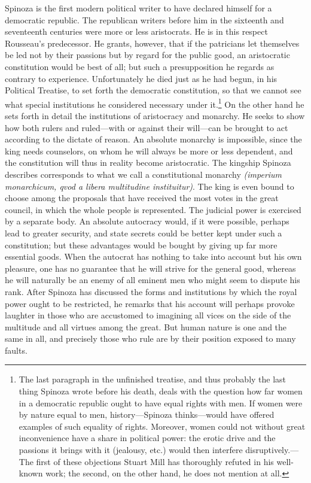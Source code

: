 \documentclass[12pt]{book}
\newcommand{\opage}[1]{\marginnote{\footnotesize\textit{[#1]}}}
\begin{document}
Spinoza is the first modern political writer to have declared himself for a democratic
republic. The republican writers before him in the sixteenth and seventeenth centuries
were more or less aristocrats. He is in this respect Rousseau's predecessor. He grants,
however, that if the patricians let themselves be led not by their passions but by
regard for the public good, an aristocratic constitution would be best of all; but such a
presupposition he regards as contrary to experience. Unfortunately he died just as he had
begun, in his Political Treatise, to set forth the democratic constitution, so that we
cannot see what special institutions he considered \opage{153}necessary under
it.\footnote{The last paragraph in the unfinished treatise, and thus probably the last
thing Spinoza wrote before his death, deals with the question how far women in a
democratic republic ought to have equal rights with men. If women were by nature equal to
men, history---Spinoza thinks---would have offered examples of such equality of rights.
Moreover, women could not without great inconvenience have a share in political power:
the erotic drive and the passions it brings with it (jealousy, etc.) would then interfere
disruptively.---The first of these objections Stuart Mill has thoroughly refuted in his
well-known work; the second, on the other hand, he does not mention at all.} On the other
hand he sets forth in detail the institutions of aristocracy and monarchy. He seeks to
show how both rulers and ruled---with or against their will---can be brought to act
according to the dictate of reason. An absolute monarchy is impossible, since the king
needs counselors, on whom he will always be more or less dependent, and the constitution
will thus in reality become aristocratic. The kingship Spinoza describes corresponds to
what we call a constitutional monarchy \textit{(imperium monarchicum, qvod a libera
multitudine instituitur)}. The king is even bound to choose among the proposals that have
received the most votes in the great council, in which the whole people is represented.
The judicial power is exercised by a separate body. An absolute autocracy would, if it
were possible, perhaps lead to greater security, and state secrets could be better kept
under such a constitution; but these advantages would be bought by giving up far more
essential goods. When the autocrat has nothing to take into account but his own pleasure,
one has \opage{154}no guarantee that he will strive for the general good, whereas he will
naturally be an enemy of all eminent men who might seem to dispute his rank. After Spinoza
has discussed the forms and institutions by which the royal power ought to be restricted,
he remarks that his account will perhaps provoke laughter in those who are accustomed to
imagining all vices on the side of the multitude and all virtues among the great. But
human nature is one and the same in all, and precisely those who rule are by their
position exposed to many faults.
\end{document}
